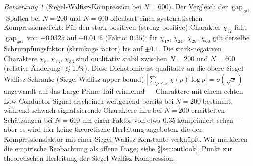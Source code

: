 \documentclass[10pt,twocolumn]{article}
\theoremstyle{definition}
\theoremstyle{remark}
\newtheorem{remark}[theorem]{Bemerkung}
\newcommand{\gap}{\operatorname{gap}}
\newcommand{\chifn}{\chi}
\begin{document}
\begin{remark}[Siegel-Walfisz-Kompression bei $N=600$]
\label{rem:sw-compression}
Der Vergleich der $\gap_{\mathrm{gal}}$-Spalten bei $N=200$ und $N=600$
offenbart einen systematischen Kompressionseffekt: Für den stark-positiven (strong-positive)
Charakter $\chifn_{12}$ fällt $\gap_{\mathrm{gal}}$ von
$+0.0325$ auf $+0.0115$ (Faktor $0.35$); für $\chifn_{17}$,
$\chifn_{24}$, $\chifn_{29}$, $\chifn_{60}$ gilt derselbe
Schrumpfungsfaktor (shrinkage factor) bis auf $\pm 0.1$. Die stark-negativen
Charaktere $\chifn_8$, $\chifn_{13}$, $\chifn_{33}$ sind
qualitativ stabil zwischen $N=200$ und $N=600$ (relative Änderung
$\lesssim 10\%$). Diese Dichotomie ist qualitativ an die obere
Siegel-Walfisz-Schranke (Siegel-Walfisz upper bound)
$|\sum_{p\leq x}\chifn(p)\log p|=o(\sqrt{x})$ angewandt auf das
Large-Prime-Tail erinnernd --- Charaktere mit einem echten
Low-Conductor-Signal erscheinen weitgehend bereits bei $N=200$ bestimmt,
während schwach signalisierende Charaktere ihre bei $N=200$ ermittelten
Schätzungen bei $N=600$ um einen Faktor von etwa $0.35$ komprimiert sehen
--- aber es wird hier keine theoretische Herleitung angeboten, die den
Kompressionsfaktor mit einer Siegel-Walfisz-Konstante verknüpft. Wir
markieren die empirische Beobachtung als offene Frage; siehe
\S\ref{sec:outlook}, Punkt zur theoretischen Herleitung der
Siegel-Walfisz-Kompression.
\end{remark}
\end{document}

